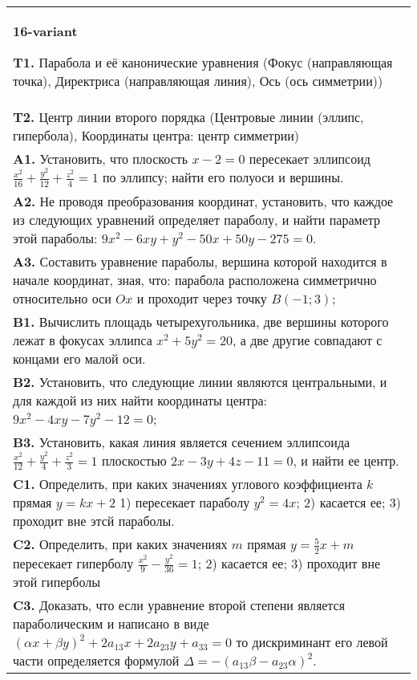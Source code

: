 \documentclass{article}
\begin{document}
\begin{tabular}{m{17cm}}
\textbf{16-variant}
\newline

\textbf{T1.} Парабола и её канонические уравнения (Фокус (направляющая точка), Директриса (направляющая линия), Ось (ось симметрии)) \\
\textbf{T2.} Центр линии второго порядка (Центровые линии (эллипс, гипербола), Координаты центра: центр симметрии) \\
\textbf{A1.} Установить, что плоскость $x-2=0$ пересекает эллипсоид $\frac{x^2}{16}+\frac{y^2}{12}+\frac{z^2}{4}=1$ по эллипсу; найти его полуоси и вершины. \\
\textbf{A2.} Не проводя преобразования координат, установить, что каждое из следующих уравнений определяет параболу, и найти параметр этой параболы: $9 x^2-6 x y+y^2-50 x+50 y-275=0$. \\
\textbf{A3.} Составить уравнение параболы, вершина которой находится в начале координат, зная, что: парабола расположена симметрично относительно оси $O x$ и проходит через точку $B(-1 ; 3)$; \\
\textbf{B1.} Вычислить площадь четырехугольника, две вершины которого лежат в фокусах эллипса $x^2+5 y^2=20$, а две другие совпадают с концами его малой оси. \\
\textbf{B2.} Установить, что следующие линии являются центральными, и для каждой из них найти координаты центра: $9 x^2-4 x y-7 y^2-12=0$; \\
\textbf{B3.} Установить, какая линия является сечением эллипсоида $\frac{x^2}{12}+\frac{y^2}{4}+\frac{z^2}{3}=1$ плоскостью $2 x-3 y+4 z-11=0$, и найти ее центр. \\
\textbf{C1.} Определить, при каких значениях углового коэффициента $k$ прямая $y=k x+2$ 1) пересекает параболу $y^2=4 x$; 2) касается ее; 3) проходит вне этсй параболы. \\
\textbf{C2.} Определить, при каких значениях $m$ прямая $y=\frac{5}{2} x+m$ пересекает гиперболу $\frac{x^2}{9}-\frac{y^2}{36}=1$; 2) касается ее; 3) проходит вне этой гиперболы \\
\textbf{C3.} Доказать, что если уравнение второй степени является параболическим и написано в виде $ (\alpha x+\beta y) ^2+2a_{13}x+2a_{23}y+a_{33}=0$ то дискриминант его левой части определяется формулой $\Delta=- (a_{13} \beta-a_{23} \alpha) ^2$. \\

\end{tabular}
\vspace{1cm}
\end{document}
